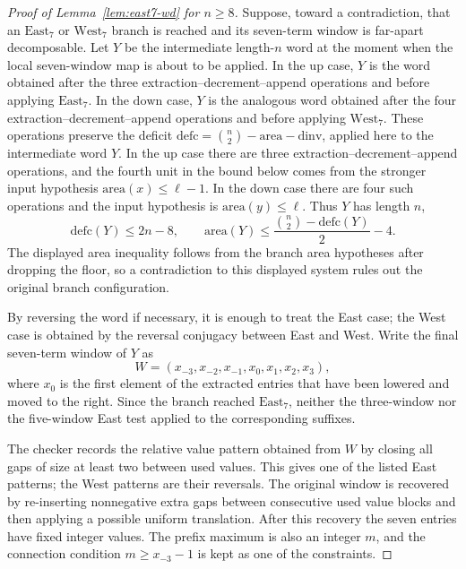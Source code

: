 \documentclass[11pt]{article}
\theoremstyle{plain}
\theoremstyle{definition}
\theoremstyle{remark}
\newcommand{\dinv}{\mathrm{dinv}}
\newcommand{\area}{\mathrm{area}}
\newcommand{\defc}{\mathrm{defc}}
\begin{document}
\begin{proof}[Proof of Lemma~\ref{lem:east7-wd} for \(n\ge 8\)]
Suppose, toward a contradiction, that an \(\mathrm{East}_7\) or
\(\mathrm{West}_7\) branch is reached and its seven-term window is far-apart
decomposable.  Let \(Y\) be the intermediate length-\(n\) word at the moment
when the local seven-window map is about to be applied.  In the
\(\mathrm{up}\) case, \(Y\) is the word obtained after the three
extraction--decrement--append operations and before applying
\(\mathrm{East}_7\).  In the \(\mathrm{down}\) case, \(Y\) is the analogous
word obtained after the four extraction--decrement--append operations and
before applying \(\mathrm{West}_7\).  These operations preserve the deficit
\(\defc=\binom n2-\area-\dinv\), applied here to the intermediate word \(Y\).
In the
\(\mathrm{up}\) case there are three
extraction--decrement--append operations, and the fourth unit in the bound
below comes from the stronger input hypothesis \(\area(x)\le \ell-1\).  In the
\(\mathrm{down}\) case there are four such operations and the input hypothesis
is \(\area(y)\le \ell\).  Thus \(Y\) has length \(n\),
\[
  \defc(Y)\le 2n-8,
  \qquad
  \area(Y)\le \frac{\binom n2-\defc(Y)}2-4.
\]
The displayed area inequality follows from the branch area hypotheses after
dropping the floor, so a contradiction to this displayed system rules out the
original branch configuration.

By reversing the word if necessary, it is enough to treat the East case; the
West case is obtained by the reversal conjugacy between East and West.  Write
the final seven-term window of \(Y\) as
\[
  W=(x_{-3},x_{-2},x_{-1},x_0,x_1,x_2,x_3),
\]
where \(x_0\) is the first element of the extracted entries that have been
lowered and moved to the right.  Since the branch reached
\(\mathrm{East}_7\), neither the three-window nor the five-window East test
applied to the corresponding suffixes.

The checker records the relative value pattern obtained from \(W\) by closing
all gaps of size at least two between used values.  This gives one of the
listed East patterns; the West patterns are their reversals.  The original
window is recovered by re-inserting nonnegative extra gaps between consecutive
used value blocks and then applying a possible uniform translation.  After this
recovery the seven entries have fixed integer values.  The prefix maximum is
also an integer \(m\), and the connection condition \(m\ge x_{-3}-1\) is kept
as one of the constraints.


\end{proof}
\end{document}

